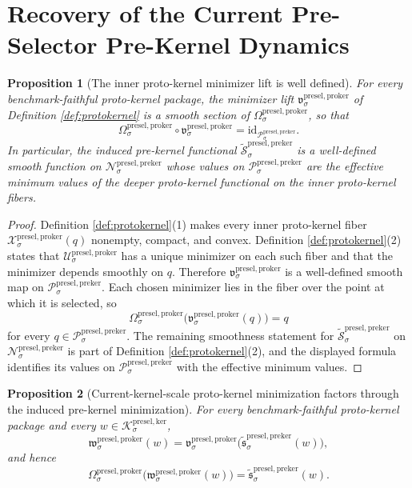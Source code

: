 \documentclass[11pt]{article}
\newcommand{\KernelBody}[1]{\mathcal K_{#1}^{\mathrm{presel,ker}}}
\newcommand{\PreKernelSpace}[1]{\mathcal N_{#1}^{\mathrm{presel,preker}}}
\newcommand{\PreKernelBody}[1]{\mathcal P_{#1}^{\mathrm{presel,preker}}}
\newcommand{\ProtoKernelProj}[1]{\Omega_{#1}^{\mathrm{presel,proker}}}
\newcommand{\ProtoKernelFiber}[2]{\mathcal X_{#1}^{\mathrm{presel,proker}}(#2)}
\newcommand{\ProtoKernelFunctional}[1]{\mathscr U_{#1}^{\mathrm{presel,proker}}}
\newcommand{\ProtoKernelMinLift}[1]{\mathfrak v_{#1}^{\mathrm{presel,proker}}}
\newcommand{\ProtoKernelKernelMin}[1]{\mathfrak w_{#1}^{\mathrm{presel,proker}}}
\newcommand{\InducedPreKernelFunctional}[1]{\widetilde{\mathscr S}_{#1}^{\mathrm{presel,preker}}}
\newcommand{\InducedPreKernelMinLift}[1]{\widetilde{\mathfrak s}_{#1}^{\mathrm{presel,preker}}}
\newtheorem{proposition}{Proposition}
\begin{document}
\section{Recovery of the Current Pre-Selector Pre-Kernel Dynamics}

\begin{proposition}[The inner proto-kernel minimizer lift is well defined]
\label{prop:inner}
For every benchmark-faithful proto-kernel package, the minimizer lift \(\ProtoKernelMinLift{\sigma}\) of Definition \ref{def:protokernel} is a smooth section of \(\ProtoKernelProj{\sigma}\), so that
\[
\ProtoKernelProj{\sigma}\circ\ProtoKernelMinLift{\sigma}
=
\mathrm{id}_{\PreKernelBody{\sigma}}.
\]
In particular, the induced pre-kernel functional \(\InducedPreKernelFunctional{\sigma}\) is a well-defined smooth function on \(\PreKernelSpace{\sigma}\) whose values on \(\PreKernelBody{\sigma}\) are the effective minimum values of the deeper proto-kernel functional on the inner proto-kernel fibers.
\end{proposition}

\begin{proof}
Definition \ref{def:protokernel}(1) makes every inner proto-kernel fiber \(\ProtoKernelFiber{\sigma}{q}\) nonempty, compact, and convex. Definition \ref{def:protokernel}(2) states that \(\ProtoKernelFunctional{\sigma}\) has a unique minimizer on each such fiber and that the minimizer depends smoothly on \(q\). Therefore \(\ProtoKernelMinLift{\sigma}\) is a well-defined smooth map on \(\PreKernelBody{\sigma}\). Each chosen minimizer lies in the fiber over the point at which it is selected, so
\[
\ProtoKernelProj{\sigma}\bigl(\ProtoKernelMinLift{\sigma}(q)\bigr)=q
\]
for every \(q\in\PreKernelBody{\sigma}\). The remaining smoothness statement for \(\InducedPreKernelFunctional{\sigma}\) on \(\PreKernelSpace{\sigma}\) is part of Definition \ref{def:protokernel}(2), and the displayed formula identifies its values on \(\PreKernelBody{\sigma}\) with the effective minimum values.
\end{proof}

\begin{proposition}[Current-kernel-scale proto-kernel minimization factors through the induced pre-kernel minimization]
\label{prop:kernelfactor}
For every benchmark-faithful proto-kernel package and every \(w\in\KernelBody{\sigma}\),
\[
\ProtoKernelKernelMin{\sigma}(w)
=
\ProtoKernelMinLift{\sigma}\bigl(\InducedPreKernelMinLift{\sigma}(w)\bigr),
\]
and hence
\[
\ProtoKernelProj{\sigma}\bigl(\ProtoKernelKernelMin{\sigma}(w)\bigr)
=
\InducedPreKernelMinLift{\sigma}(w).
\]
\end{proposition}
\end{document}
